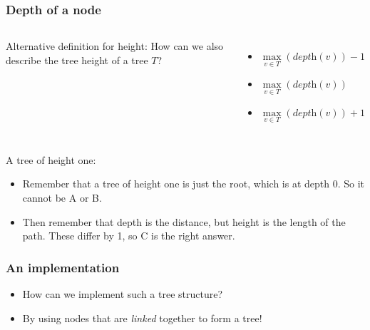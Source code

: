 \begin{frame}
	\frametitle{Depth of a node}

	\begin{columns}[T]
		Alternative definition for height: How can we also describe the tree height of a tree $T$?
			
			\begin{itemize}
				\item $\max\limits_{v\in T}({\textit{depth}(v)})-1$
				\item $\max\limits_{v\in T}({\textit{depth}(v)})$
				\item $\max\limits_{v\in T}({\textit{depth}(v)})+1$
			\end{itemize}
	\end{columns}
	
	A tree of height one:
	
			\begin{itemize}
				\item Remember that a tree of height one is just the root, which is at depth $0$. So it cannot be A or B.
				\item Then remember that depth is the distance, but height is the length of the path. These differ by 1, so C is the right answer.
			\end{itemize}
				
\end{frame}


\begin{frame}
	\frametitle{An implementation}
	
		\begin{itemize}
				\item How can we implement such a tree structure?
				\item By using nodes that are \textit{linked} together to form a tree!
	\end{itemize}
	
	\begin{columns}[t]
	
			
	
			
	\end{columns}
\end{frame}

